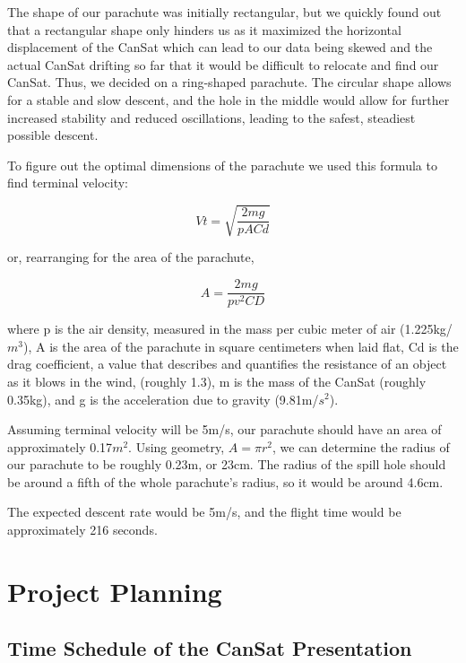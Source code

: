 \documentclass[10pt,twocolumn]{article}
\begin{document}
The shape of our parachute was initially rectangular, but we quickly found out that a rectangular shape only hinders us as it maximized the horizontal displacement of the CanSat which can lead to our data being skewed and the actual CanSat drifting so far that it would be difficult to relocate and find our CanSat. Thus, we decided on a ring-shaped parachute. The circular shape allows for a stable and slow descent, and the hole in the middle would allow for further increased stability and reduced oscillations, leading to the safest, steadiest possible descent.

To figure out the optimal dimensions of the parachute we used this formula to find terminal velocity:

\[
Vt = \sqrt{\frac{2mg}{pACd}}
\]

or, rearranging for the area of the parachute,

\[
A = \frac{2mg}{pv^2CD}
\]

where p is the air density, measured in the mass per cubic meter of air (1.225kg/$m^3$), A is the area of the parachute in square centimeters when laid flat, Cd is the drag coefficient, a value that describes and quantifies the resistance of an object as it blows in the wind, (roughly 1.3), m is the mass of the CanSat (roughly 0.35kg), and g is the acceleration due to gravity (9.81m/$s^2$).

Assuming terminal velocity will be 5m/s, our parachute should have an area of approximately 0.17$m^2$. Using geometry, \(A = \pi r^2\), we can determine the radius of our parachute to be roughly 0.23m, or 23cm. The radius of the spill hole should be around a fifth of the whole parachute’s radius, so it would be around 4.6cm.

The expected descent rate would be 5m/s, and the flight time would be approximately 216 seconds.


\section{\textbf{Project Planning}}

\subsection{Time Schedule of the CanSat Presentation}
\end{document}
